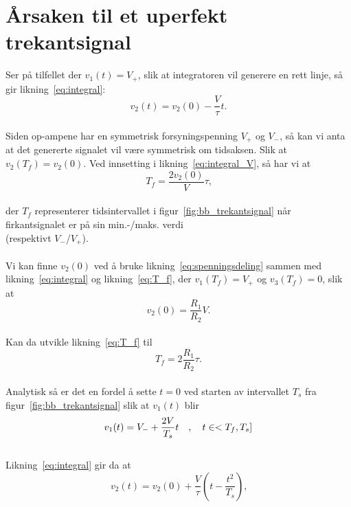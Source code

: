 \documentclass[a4paper,11pt,norsk]{article}
\begin{document}
\section{Årsaken til et uperfekt trekantsignal}\label{at:A}
Ser på tilfellet der $v_1(t) = V_+$, slik at integratoren vil generere en rett linje, så gir likning~\ref{eq:integral}:
\\
\begin{equation}
    v_2(t) = v_2(0) - \frac{V}{\tau}t \textit{.}
    \label{eq:integral_V}
\end{equation}
\\
Siden op-ampene har en symmetrisk forsyningspenning $V_+$ og $V_-$, så kan vi anta at det genererte signalet vil være symmetrisk om tidsaksen. Slik at $v_2(T_f) = v_2(0)$.
Ved innsetting i likning~\ref{eq:integral_V}, så har vi at
\\
\begin{equation}
    T_f = \frac{2v_2(0)}{V}\tau \textit{,}
    \label{eq:T_f}
\end{equation}
\\
der $T_f$ representerer tidsintervallet i figur~\ref{fig:bb_trekantsignal} når firkantsignalet er på sin min.-/maks. verdi \\ (respektivt $V_-$/$V_+$).
\\\\
Vi kan finne $v_2(0)$ ved å bruke likning~\ref{eq:spenningsdeling} sammen med likning~\ref{eq:integral} og likning~\ref{eq:T_f}, der $v_1(T_f) = V_+$ og $v_3(T_f) = 0$, slik at
\\
\begin{equation}
    v_2(0) = \frac{R_1}{R_2}V \textit{.}
    \label{eq:v_0}
\end{equation}
\\
Kan da utvikle likning~\ref{eq:T_f} til
\\
\begin{equation}
    T_f = 2 \frac{R_1}{R_2}\tau \textit{.}
\end{equation}
\\
Analytisk så er det en fordel å sette $t = 0$ ved starten av intervallet $T_s$ fra figur~\ref{fig:bb_trekantsignal} slik at $v_1(t)$ blir
\\
\begin{equation}
    v_1(t) = V_- + \frac{2V}{T_s}t \quad , \quad t\in<T_f, T_s]\\
\end{equation}
\\
\newpage
Likning~\ref{eq:integral} gir da at
\begin{equation}
    v_2(t) = v_2(0) + \frac{V}{\tau}\left ( t - \frac{t^2}{T_s} \right ) \textit{,}
\end{equation}
\end{document}
